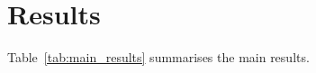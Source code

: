 
\section{Results}%
\label{sec:results}

Table~\ref{tab:main_results} summarises the main results.



